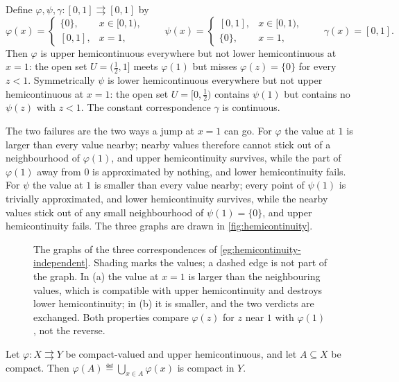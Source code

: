 \begin{eg}\label{eg:hemicontinuity-independent}
	Define $\varphi,\psi,\gamma\colon[0,1]\rightrightarrows[0,1]$ by
	\[
		\varphi(x)=\begin{cases}\{0\}, & x\in[0,1), \\ [0,1], & x=1,\end{cases}
		\qquad
		\psi(x)=\begin{cases}[0,1], & x\in[0,1), \\ \{0\}, & x=1,\end{cases}
		\qquad
		\gamma(x)=[0,1].
	\]
	Then $\varphi$ is upper hemicontinuous everywhere but not lower
	hemicontinuous at $x=1$: the open set $U=(\tfrac12,1]$ meets $\varphi(1)$ but
	misses $\varphi(z)=\{0\}$ for every $z<1$. Symmetrically $\psi$ is lower
	hemicontinuous everywhere but not upper hemicontinuous at $x=1$: the open set
	$U=[0,\tfrac12)$ contains $\psi(1)$ but contains no $\psi(z)$ with $z<1$. The
	constant correspondence $\gamma$ is continuous.

	The two failures are the two ways a jump at $x=1$ can go. For $\varphi$ the
	value at $1$ is larger than every value nearby; nearby values therefore cannot
	stick out of a neighbourhood of $\varphi(1)$, and upper hemicontinuity survives,
	while the part of $\varphi(1)$ away from $0$ is approximated by nothing, and
	lower hemicontinuity fails. For $\psi$ the value at $1$ is smaller than every
	value nearby; every point of $\psi(1)$ is trivially approximated, and lower
	hemicontinuity survives, while the nearby values stick out of any small
	neighbourhood of $\psi(1)=\{0\}$, and upper hemicontinuity fails. The three
	graphs are drawn in \autoref{fig:hemicontinuity}.
\end{eg}

\begin{figure}[htbp]
	\centering
	
	\caption[Upper and lower hemicontinuity are independent]{The graphs of the
		three correspondences of \autoref{eg:hemicontinuity-independent}. Shading
		marks the values; a dashed edge is not part of the graph. In (a) the value
		at $x=1$ is larger than the neighbouring values, which is compatible with
		upper hemicontinuity and destroys lower hemicontinuity; in (b) it is
		smaller, and the two verdicts are exchanged. Both properties compare
		$\varphi(z)$ for $z$ near $1$ with $\varphi(1)$, not the reverse.}
	\label{fig:hemicontinuity}
\end{figure}

\begin{proposition}\label{prop:corr-compact-image}
	Let $\varphi\colon X\rightrightarrows Y$ be compact-valued and upper
	hemicontinuous, and let $A\subseteq X$ be compact. Then
	$\varphi(A)\eqdef\bigcup_{x\in A}\varphi(x)$ is compact in $Y$.
\end{proposition}

